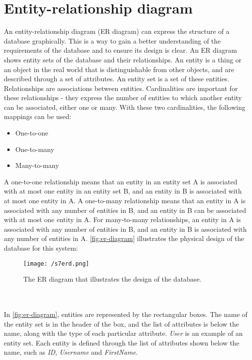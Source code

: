 \section{Entity-relationship diagram}
An entity-relationship diagram (ER diagram) can express the structure of a database graphically\cite{DBConcepts}.
This is a way to gain a better understanding of the requirements of the database and to ensure its design is clear.
An ER diagram shows entity sets of the database and their relationships.
An entity is a thing or an object in the real world that is distinguishable from other objects, and are described through a set of attributes.
An entity set is a set of these entities.
Relationships are associations between entities.
Cardinalities are important for these relationships - they express the number of entities to which another entity can be associated\cite{DBConcepts}, either one or many.
With these two cardinalities, the following mappings can be used:
\begin{itemize}
    \item One-to-one
    \item One-to-many
    \item Many-to-many
\end{itemize}
A one-to-one relationship means that an entity in an entity set A is associated with at most one entity in an entity set B, and an entity in B is associated with at most one entity in A.
A one-to-many relationship means that an entity in A is associated with any number of entities in B, and an entity in B can be associated with at most one entity in A.
For many-to-many relationships, an entity in A is associated with any number of entities in B, and an entity in B is associated with any number of entities in A\cite{DBConcepts}.
\autoref{fig:er-diagram} illustrates the physical design of the database for this system:
\begin{sidewaysfigure}[]
    \centering
    \texttt{[image: /s7erd.png]}
    \caption{The ER diagram that illustrates the design of the database.}
    \label{fig:er-diagram}
\end{sidewaysfigure}
\\\\
In \autoref{fig:er-diagram}, entities are represented by the rectangular boxes.
The name of the entity set is in the header of the box, and the list of attributes is below the name, along with the type of each particular attribute.
\textit{User} is an example of an entity set.
Each entity is defined through the list of attributes shown below the name, such as \textit{ID}, \textit{Username} and \textit{FirstName}.
